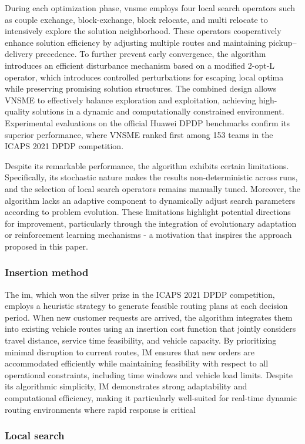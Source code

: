 \documentclass[pdflatex]{sn-jnl}
\begin{document}
During each optimization phase, \gls{vnsme} employs four local search operators such as couple exchange, block-exchange, block relocate, and multi relocate to intensively explore the solution neighborhood. These operators cooperatively enhance solution efficiency by adjusting multiple routes and maintaining pickup–delivery precedence. To further prevent early convergence, the algorithm introduces an efficient disturbance mechanism based on a modified 2-opt-L operator, which introduces controlled perturbations for escaping local optima while preserving promising solution structures. The combined design allows VNSME to effectively balance exploration and exploitation, achieving high-quality solutions in a dynamic and computationally constrained environment. Experimental evaluations on the official Huawei DPDP benchmarks confirm its superior performance, where VNSME ranked first among 153 teams in the ICAPS 2021 DPDP competition.

Despite its remarkable performance, the algorithm exhibits certain limitations. Specifically, its stochastic nature makes the results non-deterministic across runs, and the selection of local search operators remains manually tuned. Moreover, the algorithm lacks an adaptive component to dynamically adjust search parameters according to problem evolution. These limitations highlight potential directions for improvement, particularly through the integration of evolutionary adaptation or reinforcement learning mechanisms - a motivation that inspires the approach proposed in this paper.
\subsubsection{Insertion method}
The \gls{im}, which won the silver prize in the ICAPS 2021 DPDP competition, employs a heuristic strategy to generate feasible routing plans at each decision period. When new customer requests are arrived, the algorithm integrates them into existing vehicle routes using an insertion cost function that jointly considers travel distance, service time feasibility, and vehicle capacity. By prioritizing minimal disruption to current routes, IM ensures that new orders are accommodated efficiently while maintaining feasibility with respect to all operational constraints, including time windows and vehicle load limits. Despite its algorithmic simplicity, IM demonstrates strong adaptability and computational efficiency, making it particularly well-suited for real-time dynamic routing environments where rapid response is critical
\subsubsection{Local search}
\end{document}
